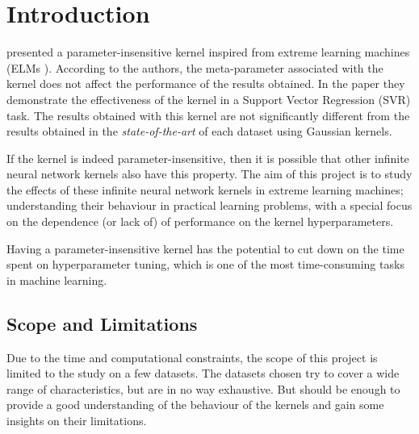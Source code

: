 \section{Introduction}%
\label{sec:introduction}


\Textcite{frenayParameterinsensitiveKernelExtreme2011} presented a
parameter-insensitive kernel inspired from extreme learning machines (ELMs
\cite{huangExtremeLearningMachine2006}).
According to the authors, the meta-parameter associated with the kernel does
not affect the performance of the results obtained. In the paper they demonstrate
the effectiveness of the kernel in a Support Vector Regression (SVR) task. The results
obtained with this kernel are not significantly different from the results obtained
in the \emph{state-of-the-art} of each dataset using Gaussian kernels.

If the kernel is indeed parameter-insensitive, then it is possible that other
infinite neural network kernels also have this property.
The aim of this project is to study the effects of these infinite neural network
kernels in extreme learning machines; understanding their behaviour in practical
learning problems, with a special focus on the dependence (or lack of) of
performance on the kernel hyperparameters.

Having a parameter-insensitive kernel has the potential to cut down on the
time spent on hyperparameter tuning, which is one of the most time-consuming
tasks in machine learning.

\subsection{Scope and Limitations}%
\label{sub:scope_and_limitations}

Due to the time and computational constraints, the scope of this project is limited
to the study on a few datasets. The datasets chosen try to cover a wide range of
characteristics, but are in no way exhaustive. But should be enough to provide
a good understanding of the behaviour of the kernels and gain some insights
on their limitations.

